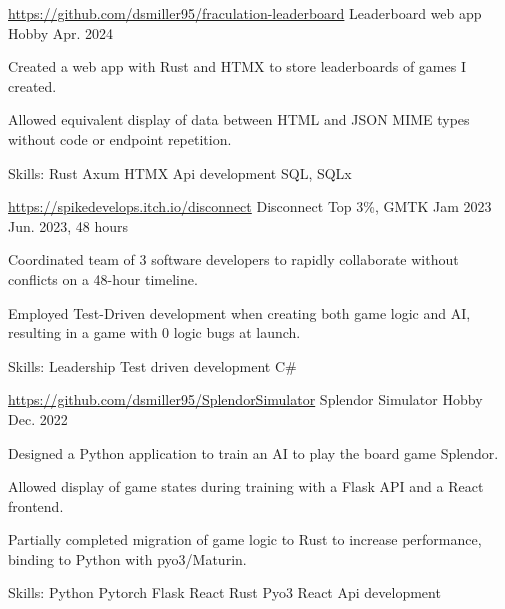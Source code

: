 \begin{cventries}
 \cventry
  {\href{https://github.com/dsmiller95/fraculation-leaderboard}{https://github.com/dsmiller95/fraculation-leaderboard}} %
   {Leaderboard web app} %
   {Hobby} %
   {Apr. 2024} %
   {
     \begin{cvitems} %
      \item {Created a web app with Rust and HTMX to store leaderboards of games I created.}
      \item {Allowed equivalent display of data between HTML and JSON MIME types without code or endpoint repetition.}
      \item {Skills: Rust \textbullet{} Axum \textbullet{} HTMX \textbullet{} Api development \textbullet{} SQL, SQLx }
     \end{cvitems}
   }

  \cventry
   {\href{https://spikedevelops.itch.io/disconnect}{https://spikedevelops.itch.io/disconnect}} %
    {Disconnect} %
    {Top 3\%, GMTK Jam 2023} %
    {Jun. 2023, 48 hours} %
    {
      \begin{cvitems} %
        \item {Coordinated team of 3 software developers to rapidly collaborate without conflicts on a 48-hour timeline.}
        \item {Employed Test-Driven development when creating both game logic and AI, resulting in a game with 0 logic bugs at launch.}
        \item {Skills: Leadership \textbullet{} Test driven development \textbullet{} C\#}
      \end{cvitems}
 }

 \cventry
  {\href{https://github.com/dsmiller95/SplendorSimulator}{https://github.com/dsmiller95/SplendorSimulator}} %
   {Splendor Simulator} %
   {Hobby} %
   {Dec. 2022} %
   {
     \begin{cvitems} %
      \item {Designed a Python application to train an AI to play the board game Splendor.}
      \item {Allowed display of game states during training with a Flask API and a React frontend.}
      \item {Partially completed migration of game logic to Rust to increase performance, binding to Python with pyo3/Maturin.}
      \item {Skills: Python \textbullet{} Pytorch \textbullet{} Flask \textbullet{} React \textbullet{} Rust \textbullet{} Pyo3 \textbullet{} React \textbullet{} Api development }
     \end{cvitems}
   }



\end{cventries}
